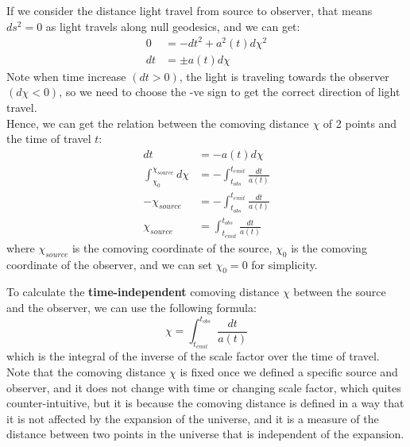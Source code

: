 \bigskip\noindent
\begin{foundation}
    If we consider the distance light travel from source to observer, that means $ds^2 = 0$ as light travels along null geodesics, and we can get:
    \begin{align*}
         0 &= -dt^2 + a^2(t) d\chi^2 \\
         dt &= \pm a(t) d\chi
    \end{align*}
    Note when time increase $(dt > 0)$, the light is traveling towards the observer $(d\chi < 0)$, so we need to choose the -ve sign to get the correct direction of light travel. \\

    Hence, we can get the relation between the comoving distance $\chi$ of 2 points and the time of travel $t$:
    \begin{align*}
        dt &= - a(t) d\chi \\
        \int_{\chi_0}^{\chi_{source}} d\chi  &= - \int_{t_{obs}}^{t_{emit}} \frac{dt}{a(t)} \\
        - \chi_{source} &= - \int_{t_{obs}}^{t_{emit}} \frac{dt}{a(t)} \\
        \chi_{source} &= \int_{t_{emit}}^{t_{obs}} \frac{dt}{a(t)} 
    \end{align*}
    where $\chi_{source}$ is the comoving coordinate of the source, $\chi_0$ is the comoving coordinate of the observer, and we can set $\chi_0 = 0$ for simplicity. \\
\end{foundation}

\bigskip\noindent
\begin{theory}
    To calculate the \textbf{time-independent} comoving distance $\chi$ between the source and the observer, we can use the following formula:
    \[
        \chi = \int_{t_{emit}}^{t_{obs}} \frac{dt}{a(t)} 
    \]
    which is the integral of the inverse of the scale factor over the time of travel. \\

    Note that the comoving distance $\chi$ is fixed once we defined a specific source and observer, and it does not change with time or changing scale factor, which quites counter-intuitive, but it is because the comoving distance is defined in a way that it is not affected by the expansion of the universe, and it is a measure of the distance between two points in the universe that is independent of the expansion. \\
\end{theory}

